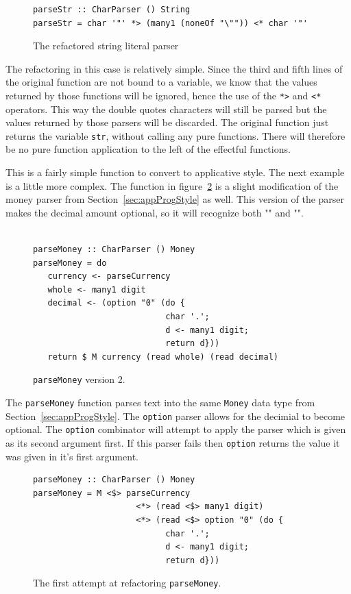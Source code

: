 \begin{figure}[t]
\begin{lstlisting}
parseStr :: CharParser () String
parseStr = char '"' *> (many1 (noneOf "\"")) <* char '"'
\end{lstlisting}
\caption{The refactored string literal parser}
\label{strLit_ref}
\end{figure}

The refactoring in this case is relatively simple. Since the third and fifth lines of the original function are not bound to a variable, we know that the values returned by those functions will be ignored, hence the use of the \texttt{*>} and \texttt{<*} operators. This way the double quotes characters will still be parsed but the values returned by those parsers will be discarded. The original 
function just returns the variable \texttt{str}, without calling any pure functions. There will therefore be no pure function application to the left of the effectful functions. 

This is a fairly simple function to convert to applicative style. The next example is a little more complex. The function in figure~\ref{pMoney2} is a slight modification of the money parser from Section~\ref{sec:appProgStyle} as well. This version of the parser makes the decimal amount optional, so it will recognize both "" and "".

\begin{figure}[t]
\begin{lstlisting}

parseMoney :: CharParser () Money
parseMoney = do
   currency <- parseCurrency 
   whole <- many1 digit
   decimal <- (option "0" (do { 
                           char '.';
                           d <- many1 digit;
                           return d}))
   return $ M currency (read whole) (read decimal)
\end{lstlisting}
\caption{\texttt{parseMoney} version 2.}
\label{pMoney2}
\end{figure}

The \texttt{parseMoney} function parses text into the same \texttt{Money} data type from Section~\ref{sec:appProgStyle}. The \texttt{option} parser allows for the decimial to become optional. The \texttt{option} combinator will attempt to apply the parser which is given as its second argument first. If this parser fails then \texttt{option} returns the value it was given in it's first argument.

\begin{figure}[t]
\begin{lstlisting}
parseMoney :: CharParser () Money
parseMoney = M <$> parseCurrency 
		             <*> (read <$> many1 digit) 
		             <*> (read <$> option "0" (do { 
                           char '.';
                           d <- many1 digit;
                           return d}))
\end{lstlisting}
\caption{The first attempt at refactoring \texttt{parseMoney}.}
\label{parseMon_ref1}
\end{figure}


